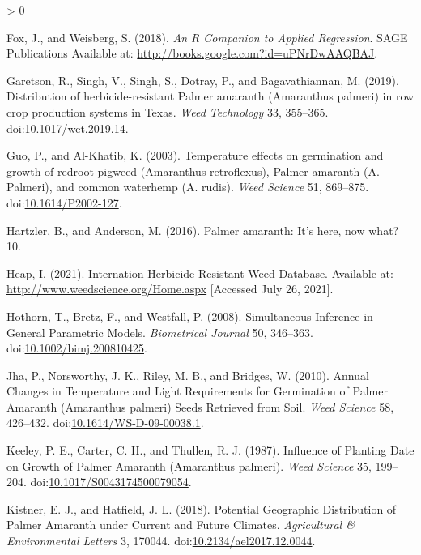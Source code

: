 \documentclass[utf8]{frontiersSCNS}
\newlength{\cslhangindent}
\newenvironment{CSLReferences}[2] %
 {%
  \setlength{\parindent}{0pt}
  \ifodd #1 \everypar{\setlength{\hangindent}{\cslhangindent}}\ignorespaces\fi
  \ifnum #2 > 0
  \setlength{\parskip}{#2\baselineskip}
  \fi
 }%
 {}
\begin{document}
\begin{CSLReferences}{1}{0}
\leavevmode\hypertarget{ref-fox2018}{}%
Fox, J., and Weisberg, S. (2018). \emph{An {R Companion} to {Applied
Regression}}. {SAGE Publications} Available at:
\url{http://books.google.com?id=uPNrDwAAQBAJ}.

\leavevmode\hypertarget{ref-garetson2019}{}%
Garetson, R., Singh, V., Singh, S., Dotray, P., and Bagavathiannan, M.
(2019). Distribution of herbicide-resistant {Palmer} amaranth
({Amaranthus} palmeri) in row crop production systems in {Texas}.
\emph{Weed Technology} 33, 355--365.
doi:\href{https://doi.org/10.1017/wet.2019.14}{10.1017/wet.2019.14}.

\leavevmode\hypertarget{ref-guo2003}{}%
Guo, P., and Al-Khatib, K. (2003). Temperature effects on germination
and growth of redroot pigweed ({Amaranthus} retroflexus), {Palmer}
amaranth ({A}. Palmeri), and common waterhemp ({A}. rudis). \emph{Weed
Science} 51, 869--875.
doi:\href{https://doi.org/10.1614/P2002-127}{10.1614/P2002-127}.

\leavevmode\hypertarget{ref-hartzler2016}{}%
Hartzler, B., and Anderson, M. (2016). Palmer amaranth: {It}'s here, now
what? 10.

\leavevmode\hypertarget{ref-heap2021}{}%
Heap, I. (2021). Internation {Herbicide}-{Resistant Weed Database}.
Available at: \url{http://www.weedscience.org/Home.aspx} {[}Accessed
July 26, 2021{]}.

\leavevmode\hypertarget{ref-hothorn2008}{}%
Hothorn, T., Bretz, F., and Westfall, P. (2008). Simultaneous
{Inference} in {General Parametric Models}. \emph{Biometrical Journal}
50, 346--363.
doi:\href{https://doi.org/10.1002/bimj.200810425}{10.1002/bimj.200810425}.

\leavevmode\hypertarget{ref-jha2010}{}%
Jha, P., Norsworthy, J. K., Riley, M. B., and Bridges, W. (2010). Annual
{Changes} in {Temperature} and {Light Requirements} for {Germination} of
{Palmer Amaranth} ({Amaranthus} palmeri) {Seeds Retrieved} from {Soil}.
\emph{Weed Science} 58, 426--432.
doi:\href{https://doi.org/10.1614/WS-D-09-00038.1}{10.1614/WS-D-09-00038.1}.

\leavevmode\hypertarget{ref-keeley1987}{}%
Keeley, P. E., Carter, C. H., and Thullen, R. J. (1987). Influence of
{Planting Date} on {Growth} of {Palmer Amaranth} ({Amaranthus} palmeri).
\emph{Weed Science} 35, 199--204.
doi:\href{https://doi.org/10.1017/S0043174500079054}{10.1017/S0043174500079054}.

\leavevmode\hypertarget{ref-kistner2018}{}%
Kistner, E. J., and Hatfield, J. L. (2018). Potential {Geographic
Distribution} of {Palmer Amaranth} under {Current} and {Future
Climates}. \emph{Agricultural \& Environmental Letters} 3, 170044.
doi:\href{https://doi.org/10.2134/ael2017.12.0044}{10.2134/ael2017.12.0044}.


\end{CSLReferences}
\end{document}
